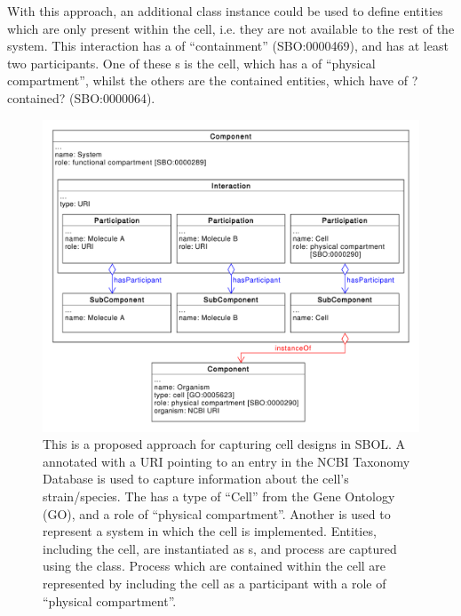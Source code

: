 With this approach, an additional  class instance could be used to define entities which are only present within the cell, i.e. they are not available to the rest of the system. 
This interaction has a  of ``containment'' (SBO:0000469), and has at least two participants. 
One of these s is the cell, which has a  of ``physical compartment'', whilst the others are the contained entities, which have  of ?contained?
(SBO:0000064).

\begin{figure}[ht]
	\begin{center}
		\includegraphics[width=\textwidth]{uml/cell_representation}
		\caption[Repressenting a cell]{This is a proposed approach for capturing cell designs in SBOL. A  annotated with a URI pointing to an entry in the NCBI Taxonomy Database is used to capture information about the cell's strain/species. 
		The  has a type of ``Cell'' from the Gene Ontology (GO), and a role of ``physical compartment''. 
		Another  is used to represent a system in which the cell is implemented. 
		Entities, including the cell, are instantiated as s, and process are captured using the  class.
		Process which are contained within the cell are represented by including the cell as a participant with a role of ``physical compartment''. }
		\label{uml:cell_representation}
	\end{center}
\end{figure}

